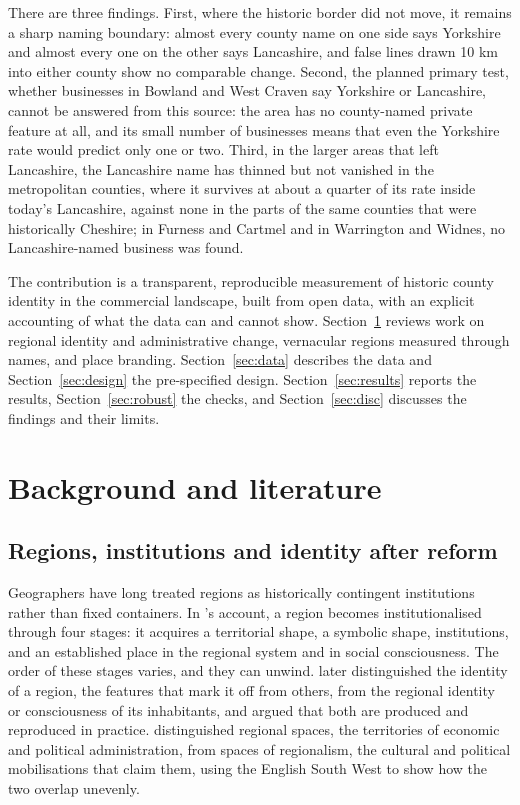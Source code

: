 \documentclass[11pt,a4paper]{article}
\begin{document}
There are three findings. First, where the historic border did not move, it remains a sharp naming boundary: almost every county name on one side says Yorkshire and almost every one on the other says Lancashire, and false lines drawn 10 km into either county show no comparable change. Second, the planned primary test, whether businesses in Bowland and West Craven say Yorkshire or Lancashire, cannot be answered from this source: the area has no county-named private feature at all, and its small number of businesses means that even the Yorkshire rate would predict only one or two. Third, in the larger areas that left Lancashire, the Lancashire name has thinned but not vanished in the metropolitan counties, where it survives at about a quarter of its rate inside today's Lancashire, against none in the parts of the same counties that were historically Cheshire; in Furness and Cartmel and in Warrington and Widnes, no Lancashire-named business was found.

The contribution is a transparent, reproducible measurement of historic county identity in the commercial landscape, built from open data, with an explicit accounting of what the data can and cannot show. Section~\ref{sec:lit} reviews work on regional identity and administrative change, vernacular regions measured through names, and place branding. Section~\ref{sec:data} describes the data and Section~\ref{sec:design} the pre-specified design. Section~\ref{sec:results} reports the results, Section~\ref{sec:robust} the checks, and Section~\ref{sec:disc} discusses the findings and their limits.

\section{Background and literature}\label{sec:lit}
\subsection{Regions, institutions and identity after reform}
Geographers have long treated regions as historically contingent institutions rather than fixed containers. In \citet{paasi1986}'s account, a region becomes institutionalised through four stages: it acquires a territorial shape, a symbolic shape, institutions, and an established place in the regional system and in social consciousness. The order of these stages varies, and they can unwind. \citet{paasi2003} later distinguished the identity of a region, the features that mark it off from others, from the regional identity or consciousness of its inhabitants, and argued that both are produced and reproduced in practice. \citet{jones2004} distinguished regional spaces, the territories of economic and political administration, from spaces of regionalism, the cultural and political mobilisations that claim them, using the English South West to show how the two overlap unevenly.
\end{document}
